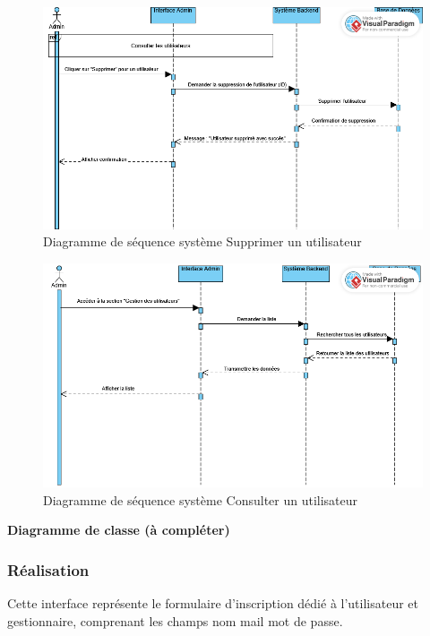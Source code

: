 \begin{figure}[H]
    \centering
    \includegraphics[width=1\linewidth]{projet/images/diagramme de sequance/supprimer utilisateur admin sequance diagram.png}
    \caption{Diagramme de séquence système Supprimer un utilisateur}
    \label{fig:diagramme4}
\end{figure}

\begin{figure}[H]
    \centering
    \includegraphics[width=1\linewidth]{projet/images/diagramme de sequance/consulter les utilisateurs admin sequnace diagram(1).png}
    \caption{Diagramme de séquence système Consulter un utilisateur}
    \label{fig:diagramme5}
\end{figure}

\textbf{Diagramme de classe (à compléter)}

\subsubsection{Réalisation}
Cette interface représente le formulaire d'inscription dédié à l'utilisateur et gestionnaire, comprenant les champs nom mail mot de passe.

